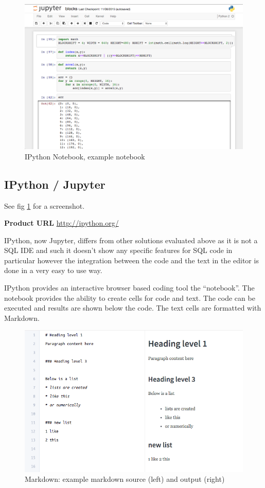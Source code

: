 \begin{figure}
  \includegraphics[width=\linewidth]{Figures/ipython.png}
  \caption{IPython Notebook, example notebook}
  \label{fig:ipythonnotebook}
\end{figure}

\subsection{IPython / Jupyter}\label{ipython-jupyter}

\noindent
See fig \ref{fig:ipythonnotebook} for a screenshot.

\noindent
\textbf{Product URL}\cite{PER-GRA:2007}
\url{http://ipython.org/}

IPython, now Jupyter, differs from other solutions evaluated above as it is not
a SQL IDE and such it doesn't show any specific features for SQL code in
particular however the integration between the code and the text in the editor
is done in a very easy to use way.

IPython provides an interactive browser based coding tool the ``notebook''. The notebook provides the ability to create cells for code and text. The code can be executed and results are shown below the code. The text cells are formatted with Markdown\cite{wiki:markdown}.

\begin{figure}
  \includegraphics[width=\linewidth]{Figures/markdown.png}
  \caption{Markdown: example markdown source (left) and output (right)}
  \label{fig:markdownexample}
\end{figure}

